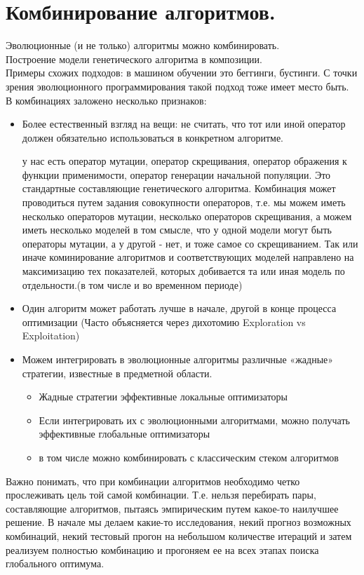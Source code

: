 \section{Комбинирование алгоритмов.}
Эволюционные (и не только) алгоритмы можно комбинировать.\\
Построение модели генетического алгоритма в композиции.\\
Примеры схожих подходов: в машином обучении это беггинги, бустинги. С точки зрения эволюционного программирования такой подход тоже имеет место быть.\\
В комбинациях заложено несколько признаков:
\begin{itemize}
    \item Более естественный взгляд на вещи: не считать, что тот или иной оператор должен обязательно использоваться в конкретном алгоритме.
    
    у нас есть оператор мутации, оператор скрещивания, оператор ображения к функции применимости, оператор генерации начальной популяции. Это стандартные составляющие генетического алгоритма. Комбинация может проводиться путем задания совокупности операторов, т.е. мы можем иметь несколько операторов мутации, несколько операторов скрещивания, а можем иметь несколько моделей в том смысле, что у одной модели могут быть операторы мутации, а у другой - нет, и тоже самое со скрещиванием. Так или иначе коминирование алгоритмов и соответствующих моделей направлено на максимизацию тех показателей, которых добивается та или иная модель по отдельности.(в том числе и во временном периоде)
    \item Один алгоритм может работать лучше в начале, другой в конце процесса оптимизации (Часто объясняется через дихотомию Exploration vs Exploitation)
    \item Можем интегрировать в эволюционные алгоритмы различные «жадные» стратегии, известные в предметной области. 
    \begin{itemize}
        \item Жадные стратегии эффективные локальные оптимизаторы
        \item Если интегрировать их с эволюционными алгоритмами, можно получать эффективные глобальные оптимизаторы
        \item в том числе можно комбинировать с классическим стеком алгоритмов
    \end{itemize}
\end{itemize}
Важно понимать, что при комбинации алгоритмов необходимо четко прослеживать цель той самой комбинации. Т.е. нельзя перебирать пары, составляющие  алгоритмов, пытаясь эмпирическим путем какое-то наилучшее решение. В начале мы делаем какие-то исследования, некий прогноз возможных комбинаций, некий тестовый прогон на небольшом количестве итераций и затем реализуем полностью комбинацию и прогоняем ее на всех этапах поиска глобального оптимума.
